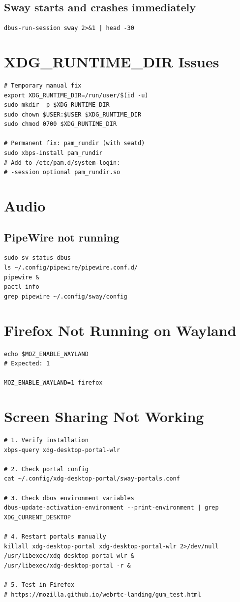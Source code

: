 \documentclass[12pt, a4paper]{book}
\begin{document}
\subsection{Sway starts and crashes immediately}
\begin{lstlisting}
dbus-run-session sway 2>&1 | head -30
\end{lstlisting}

\section{XDG\_RUNTIME\_DIR Issues}
\begin{lstlisting}
# Temporary manual fix
export XDG_RUNTIME_DIR=/run/user/$(id -u)
sudo mkdir -p $XDG_RUNTIME_DIR
sudo chown $USER:$USER $XDG_RUNTIME_DIR
sudo chmod 0700 $XDG_RUNTIME_DIR

# Permanent fix: pam_rundir (with seatd)
sudo xbps-install pam_rundir
# Add to /etc/pam.d/system-login:
# -session optional pam_rundir.so
\end{lstlisting}

\section{Audio}

\subsection{PipeWire not running}
\begin{lstlisting}
sudo sv status dbus
ls ~/.config/pipewire/pipewire.conf.d/
pipewire &
pactl info
grep pipewire ~/.config/sway/config
\end{lstlisting}

\section{Firefox Not Running on Wayland}
\begin{lstlisting}
echo $MOZ_ENABLE_WAYLAND
# Expected: 1

MOZ_ENABLE_WAYLAND=1 firefox
\end{lstlisting}

\section{Screen Sharing Not Working}
\begin{lstlisting}
# 1. Verify installation
xbps-query xdg-desktop-portal-wlr

# 2. Check portal config
cat ~/.config/xdg-desktop-portal/sway-portals.conf

# 3. Check dbus environment variables
dbus-update-activation-environment --print-environment | grep XDG_CURRENT_DESKTOP

# 4. Restart portals manually
killall xdg-desktop-portal xdg-desktop-portal-wlr 2>/dev/null
/usr/libexec/xdg-desktop-portal-wlr &
/usr/libexec/xdg-desktop-portal -r &

# 5. Test in Firefox
# https://mozilla.github.io/webrtc-landing/gum_test.html
\end{lstlisting}
\end{document}
